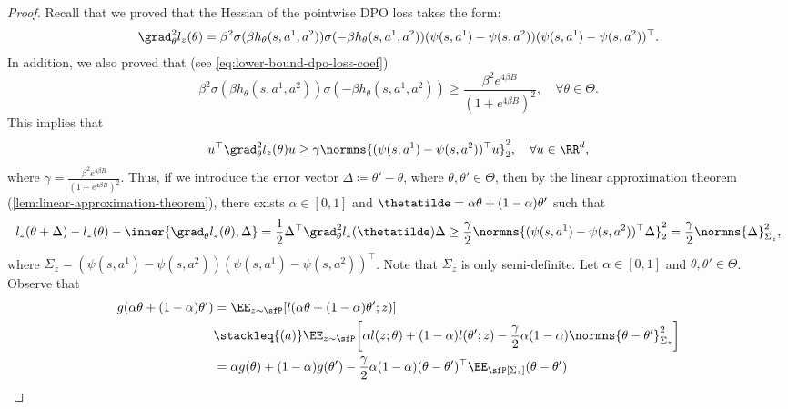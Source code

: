 \begin{proof}
Recall that we proved that the Hessian of the pointwise DPO loss takes the form:
    \begin{equation*}
        \grad_\theta^2 l_z(\theta) =  \beta^2\sigma(\beta h_\theta(s,a^1,a^2))\sigma(-\beta h_\theta(s,a^1,a^2))  (\psi(s,a^1) - \psi(s,a^2))(\psi(s,a^1) - \psi(s,a^2))^{\top}.
    \end{equation*}
    In addition, we also proved that (see \cref{eq:lower-bound-dpo-loss-coef})
    \begin{equation*}
    \beta^2\sigma(\beta h_\theta(s,a^1,a^2))\sigma(-\beta h_\theta(s,a^1,a^2)) \geq \frac{\beta^2 e^{4\beta B}}{(1+e^{4\beta B})^2}, \quad \forall\theta\in\Theta.
    \end{equation*}
    This implies that
    \begin{equation*}
        u^{\top}\grad_\theta^2 l_z(\theta) u \geq \gamma \normns{(\psi(s,a^1)-\psi(s,a^2))^{\top}u}^2_2, \quad \forall u\in\RR^d,
    \end{equation*}
    where $\gamma=\frac{\beta^2e^{4\beta B}}{(1+e^{4\beta B})^2}$. Thus, if we introduce the error vector $\Delta\coloneqq \theta'-\theta$, where $\theta,\theta'\in\Theta$, then by the linear approximation theorem (\cref{lem:linear-approximation-theorem}), there exists $\alpha\in[0,1]$ and $\thetatilde=\alpha\theta+(1-\alpha)\theta'$ such that
 \begin{equation}\label{eq:dpo-loss-lower-bounding-almost-strong-convex}
     l_z(\theta+\Delta) - l_z(\theta) - \inner{\grad_\theta l_z(\theta), \Delta} = \frac{1}{2}\Delta^{\top}\grad_\theta^2 l_z(\thetatilde) \Delta \geq \frac{\gamma}{2}\normns{(\psi(s,a^1)-\psi(s,a^2))^{\top}\Delta}^2_2 = \frac{\gamma}{2}\normns{\Delta}^2_{\Sigma_z},
 \end{equation}
where $\Sigma_z = (\psi(s,a^1)-\psi(s,a^2))(\psi(s,a^1)-\psi(s,a^2))^{\top}$. Note that $\Sigma_z$ is only semi-definite. Let $\alpha\in[0,1]$ and $\theta,\theta'\in\Theta$. Observe that
\begin{align*}
    g(\alpha\theta+(1-\alpha)\theta') &= \EE_{z\sim\sfP}[l(\alpha\theta+(1-\alpha)\theta'; z)] \\
    &\stackleq{(a)} \EE_{z\sim\sfP} \bigg[\alpha l(z;\theta) + (1-\alpha) l(\theta';z)-\frac{\gamma}{2}\alpha(1-\alpha)\normns{\theta-\theta'}^2_{\Sigma_z} \bigg] \\
    &= \alpha g(\theta) + (1-\alpha) g(\theta') - \frac{\gamma}{2}\alpha(1-\alpha)(\theta-\theta')^{\top} \EE_\sfP[\Sigma_z](\theta-\theta') \\

\end{align*}
\end{proof}
